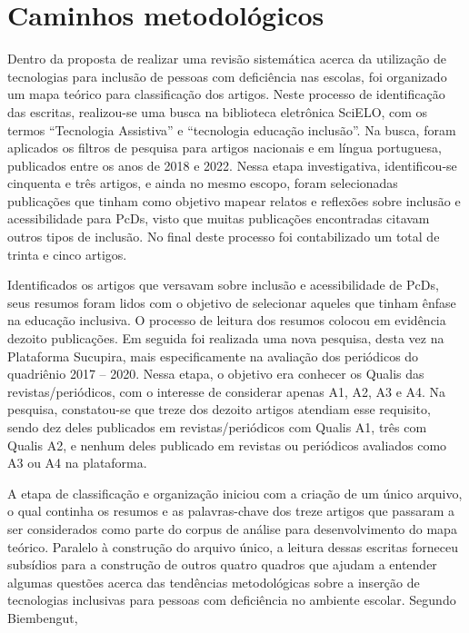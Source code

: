\documentclass[preprint, 3p,
authoryear]{elsarticle} %
\begin{document}
\section{Caminhos metodológicos}\label{caminhos-metodoluxf3gicos}

Dentro da proposta de realizar uma revisão sistemática acerca da
utilização de tecnologias para inclusão de pessoas com deficiência nas
escolas, foi organizado um mapa teórico para classificação dos artigos.
Neste processo de identificação das escritas, realizou-se uma busca na
biblioteca eletrônica SciELO, com os termos ``Tecnologia Assistiva'' e
``tecnologia educação inclusão''. Na busca, foram aplicados os filtros
de pesquisa para artigos nacionais e em língua portuguesa, publicados
entre os anos de 2018 e 2022. Nessa etapa investigativa, identificou-se
cinquenta e três artigos, e ainda no mesmo escopo, foram selecionadas
publicações que tinham como objetivo mapear relatos e reflexões sobre
inclusão e acessibilidade para PcDs, visto que muitas publicações
encontradas citavam outros tipos de inclusão. No final deste processo
foi contabilizado um total de trinta e cinco artigos.

Identificados os artigos que versavam sobre inclusão e acessibilidade de
PcDs, seus resumos foram lidos com o objetivo de selecionar aqueles que
tinham ênfase na educação inclusiva. O processo de leitura dos resumos
colocou em evidência dezoito publicações. Em seguida foi realizada uma
nova pesquisa, desta vez na Plataforma Sucupira, mais especificamente na
avaliação dos periódicos do quadriênio 2017 -- 2020. Nessa etapa, o
objetivo era conhecer os Qualis das revistas/periódicos, com o interesse
de considerar apenas A1, A2, A3 e A4. Na pesquisa, constatou-se que
treze dos dezoito artigos atendiam esse requisito, sendo dez deles
publicados em revistas/periódicos com Qualis A1, três com Qualis A2, e
nenhum deles publicado em revistas ou periódicos avaliados como A3 ou A4
na plataforma.

A etapa de classificação e organização iniciou com a criação de um único
arquivo, o qual continha os resumos e as palavras-chave dos treze
artigos que passaram a ser considerados como parte do corpus de análise
para desenvolvimento do mapa teórico. Paralelo à construção do arquivo
único, a leitura dessas escritas forneceu subsídios para a construção de
outros quatro quadros que ajudam a entender algumas questões acerca das
tendências metodológicas sobre a inserção de tecnologias inclusivas para
pessoas com deficiência no ambiente escolar. Segundo Biembengut,
\end{document}
